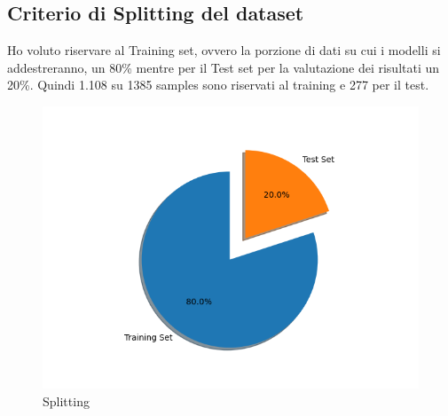 \subsection{Criterio di Splitting del dataset}

Ho voluto riservare al Training set, ovvero la porzione di dati su cui i modelli si addestreranno, un 80\% mentre per il Test set per la valutazione dei risultati un 20\%. Quindi 1.108 su 1385 samples sono riservati al training e 277 per il test.

\begin{figure}[H]
    \centering
    \includegraphics[width=0.75\columnwidth]{figures/pieSplitting.png}
    \caption{Splitting}
    \label{fig:splitting}
\end{figure}

    



